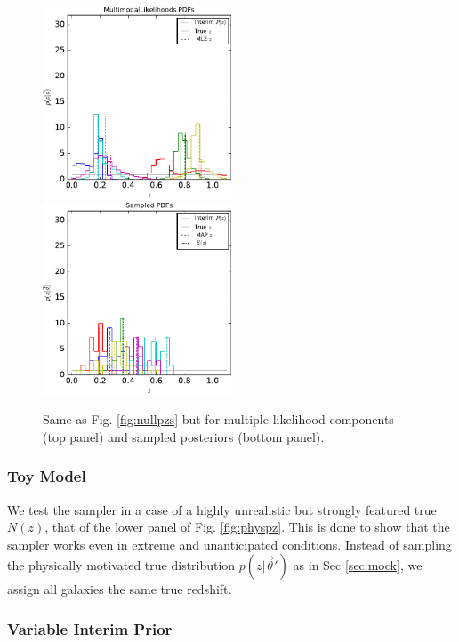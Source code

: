\documentclass[preprint]{aastex}
\begin{document}
\begin{figure}
\includegraphics[width=0.5\textwidth]{figs/mult/samplepzs.pdf}\\
\includegraphics[width=0.5\textwidth]{figs/samp/samplepzs.pdf}
\caption{Same as Fig. \ref{fig:nullpzs} but for multiple likelihood components 
(top panel) and sampled posteriors (bottom panel).}
\label{fig:allpzs}
\end{figure}

\subsubsection{Toy Model}
\label{sec:fake-data}

We test the sampler in a case of a highly unrealistic but strongly featured 
true $N(z)$, that of the lower panel of Fig. \ref{fig:physpz}.  This is done to 
show that the sampler works even in extreme and unanticipated conditions.  
Instead of sampling the physically motivated true distribution 
$p(z|\vec{\theta}')$ as in Sec \ref{sec:mock}, we assign all galaxies the same 
true redshift.  

\subsubsection{Variable Interim Prior}
\label{sec:interim-data}
\end{document}

